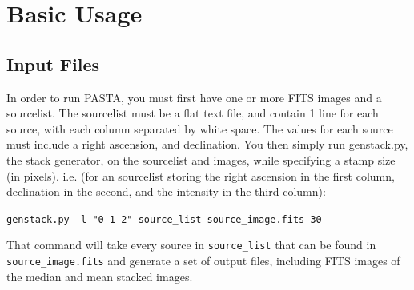 \documentclass{article}
\begin{document}
\section{Basic Usage}

\subsection{Input Files}
In order to run PASTA, you must first have one or more FITS images and a sourcelist. The sourcelist must be a flat text file, and contain 1 line for each source,
with each column separated by white space. The values for each source must 
include a right ascension, and declination.  You then simply run genstack.py, 
 the stack generator, on the sourcelist and images, while 
specifying a stamp size (in pixels). i.e. (for an sourcelist storing the right
ascension in the first column, declination in the second, and the intensity in
the third column):
\begin{center}
\verb!genstack.py -l "0 1 2" source_list source_image.fits 30!
\end{center}
That command will take every source in \verb!source_list! that can be found in 
\verb!source_image.fits! and generate a set of output files, including FITS
images of the median and mean stacked images.
\end{document}
